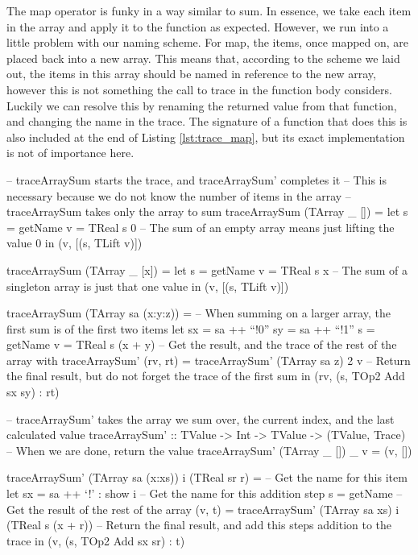         The map operator is funky in a way similar to sum.
        In essence, we take each item in the array and apply it to the function as expected.
        However, we run into a little problem with our naming scheme.
        For map, the items, once mapped on, are placed back into a new array.
        This means that, according to the scheme we laid out, the items in this array should be named in reference to the new array, however this is not something the call to trace in the function body considers.
        Luckily we can resolve this by renaming the returned value from that function, and changing the name in the trace.
        The signature of a function that does this is also included at the end of Listing \ref{lst:trace_map}, but its exact implementation is not of importance here.

        \begin{haskell}[caption=Tracing the sum operator, label=lst:trace_sum, gobble=12]
            -- traceArraySum starts the trace, and traceArraySum' completes it
            -- This is necessary because we do not know the number of items in the array
            -- traceArraySum takes only the array to sum
            traceArraySum (TArray _ []) =
                let s = getName
                    v = TReal s 0
                -- The sum of an empty array means just lifting the value 0
                in  (v, [(s, TLift v)])

            traceArraySum (TArray _ [x]) =
                let s = getName
                    v = TReal s x
                -- The sum of a singleton array is just that one value
                in  (v, [(s, TLift v)])

            traceArraySum (TArray sa (x:y:z)) =
                -- When summing on a larger array, the first sum is of the first two items
                let sx = sa ++ ``!0''
                    sy = sa ++ ``!1''
                    s  = getName
                    v  = TReal s (x + y)
                    -- Get the result, and the trace of the rest of the array with traceArraySum'
                    (rv, rt) = traceArraySum' (TArray sa z) 2 v
                -- Return the final result, but do not forget the trace of the first sum
                in  (rv, (s, TOp2 Add sx sy) : rt)

            -- traceArraySum' takes the array we sum over, the current index, and the last calculated value
            traceArraySum' :: TValue -> Int -> TValue -> (TValue, Trace)
            -- When we are done, return the value
            traceArraySum' (TArray _ []) _ v = (v, [])
            
            traceArraySum' (TArray sa (x:xs)) i (TReal sr r) =
                -- Get the name for this item
                let sx = sa ++ `!' : show i
                    -- Get the name for this addition step
                    s  = getName
                    -- Get the result of the rest of the array
                    (v, t) = traceArraySum' (TArray sa xs) i (TReal s (x + r))
                -- Return the final result, and add this steps addition to the trace
                in  (v, (s, TOp2 Add sx sr) : t)
        \end{haskell}

